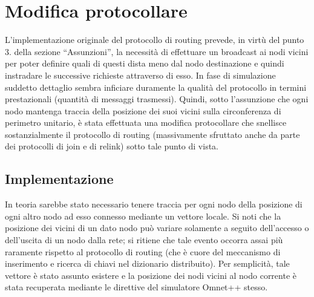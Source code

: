\documentclass[	
	DIV=calc,
	paper=a4,
	fontsize=11pt,
	onecolumn
]{scrartcl} %
\begin{document}
\section{Modifica protocollare}
	L'implementazione originale del protocollo di routing prevede, in virtù del punto 3. della sezione ``Assunzioni'', la necessità di effettuare un broadcast ai nodi vicini per poter definire quali di questi dista meno dal nodo destinazione e quindi instradare le successive richieste attraverso di esso. In fase di simulazione suddetto dettaglio sembra inficiare duramente la qualità del protocollo in termini prestazionali (quantità di messaggi trasmessi). Quindi, sotto l'assunzione che ogni nodo mantenga traccia della posizione dei suoi vicini sulla circonferenza di perimetro unitario, è stata effettuata una modifica protocollare che snellisce sostanzialmente il protocollo di routing (massivamente sfruttato anche da parte dei protocolli di join e di relink) sotto tale punto di vista. 	
	\subsection{Implementazione}	
	In teoria sarebbe stato necessario tenere traccia per ogni nodo della posizione di ogni altro nodo ad esso connesso mediante un vettore locale. Si noti che la posizione dei vicini di un dato nodo può variare solamente a seguito dell'accesso o dell'uscita di un nodo dalla rete; si ritiene che tale evento occorra assai più raramente rispetto al protocollo di routing (che è cuore del meccanismo di inserimento e ricerca di chiavi nel dizionario distribuito). Per semplicità, tale vettore è stato assunto esistere e la posizione dei nodi vicini al nodo corrente è stata recuperata mediante le direttive del simulatore Omnet++ stesso. 
\end{document}
